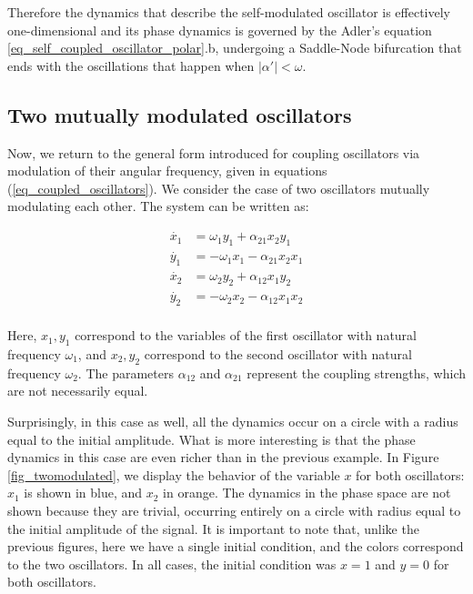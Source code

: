 \documentclass{article}
\begin{document}
Therefore the dynamics that describe the self-modulated oscillator is effectively one-dimensional and its phase dynamics is governed by the Adler's equation \ref{eq_self_coupled_oscillator_polar}.b, undergoing a Saddle-Node bifurcation that ends with the oscillations that happen when $|\alpha'|<\omega$.


\subsection{Two mutually modulated oscillators}

Now, we return to the general form introduced for coupling oscillators via modulation of their angular frequency, given in equations (\ref{eq_coupled_oscillators}). 
We consider the case of two oscillators mutually modulating each other. The system can be written as:


\begin{subequations} \label{eq_twomodulated}
\begin{align}
    \dot{x_1} & = \omega_1 y_1+ \alpha_{21} x_2 y_1 \\
    \dot{y_1} & = -\omega_1 x_1 - \alpha_{21} x_2 x_1 \\
    \dot{x_2} & = \omega_2 y_2+ \alpha_{12} x_1 y_2 \\
    \dot{y_2} & = -\omega_2 x_2 - \alpha_{12} x_1 x_2 \\
\end{align}
\end{subequations}

Here, $x_1, y_1$ correspond to the variables of the first oscillator with natural frequency $\omega_1$, and $x_2, y_2$ correspond to the second oscillator with natural frequency $\omega_2$. The parameters $\alpha_{12}$ and $\alpha_{21}$ represent the coupling strengths, which are not necessarily equal.

Surprisingly, in this case as well, all the dynamics occur on a circle with a radius equal to the initial amplitude. 
What is more interesting is that the phase dynamics in this case are even richer than in the previous example. 
In Figure \ref{fig_twomodulated}, we display the behavior of the variable $x$ for both oscillators: $x_1$ is shown in blue, and $x_2$ in orange. 
The dynamics in the phase space are not shown because they are trivial, occurring entirely on a circle with 
radius equal to the initial amplitude of the signal. 
It is important to note that, unlike the previous figures, here we have a single initial condition, and the colors correspond to the two oscillators. 
In all cases, the initial condition was $x = 1$ and $y = 0$ for both oscillators.
\end{document}
